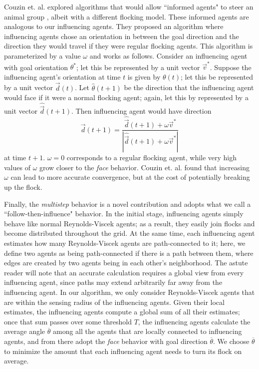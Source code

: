 Couzin et. al. explored algorithms that would allow ``informed agents" to steer
an animal group \cite{couzin2005}, albeit with a different flocking model.
These informed agents are analogous to our influencing agents.
They proposed an algorithm where influencing agents chose an orientation in
between the goal direction and the direction they would travel if they were
regular flocking agents.
This algorithm is parameterized by a value $\omega$ and works as follows.
Consider an influencing agent with goal orientation $\theta^*$; let this be
represented by a unit vector $\vec{v}^*$.
Suppose the influencing agent's orientation at time $t$ is given by
$\theta(t)$; let this be represented by a unit vector $\vec{d}(t)$.
Let $\hat{\theta}(t+1)$ be the direction that the influencing agent would face
if it were a normal flocking agent; again, let this by represented by a unit
vector $\hat{\vec{d}}(t+1)$.
Then influencing agent would have direction
$$\vec{d}(t+1) = \frac{\hat{\vec{d}}(t+1) + \omega\vec{v}^*}
{|\hat{\vec{d}}(t+1) + \omega\vec{v}^*|}$$
at time $t+1$.
$\omega=0$ corresponds to a regular flocking agent, while very high
values of $\omega$ grow closer to the \textit{face} behavior.
Couzin et. al. found that increasing $\omega$ can lead to more accurate
convergence, but at the cost of potentially breaking up the flock.

Finally, the \textit{multistep} behavior is a novel contribution and adopts
what we call a ``follow-then-influence" behavior.
In the initial stage, influencing agents simply behave like normal Reynolds-Viscek 
agents; as a result, they easily join flocks and become distributed throughout
the grid.
At the same time, each influencing agent estimates how many Reynolds-Viscek agents
are path-connected to it; here, we define two agents as being path-connected if
there is a path between them, where edges are created by two agents being in
each other's neighborhood.
The astute reader will note that an accurate calculation requires a global view
from every influencing agent, since paths may extend arbitrarily far away from
the influencing agent.
In our algorithm, we only consider Reynolds-Viscek agents that are within the
sensing radius of the influencing agents.
Given their local estimates, the influencing agents compute a global sum of all
their estimates; once that sum passes over some threshold $T$, the influencing
agents calculate the average angle $\overline{\theta}$ among all the agents that
are locally connected to influencing agents, and from there adopt the
\textit{face} behavior with goal direction $\overline{\theta}$.
We choose $\overline{\theta}$ to minimize the amount that each influencing 
agent needs to turn its flock on average.

